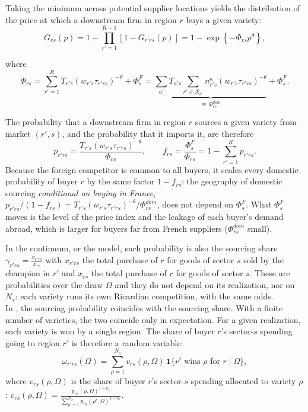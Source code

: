 Taking the minimum across potential supplier locations yields the distribution of the price at which a downstream firm in region $r$ buys a given variety:
\begin{equation}
G_{rs}(p) =1-\prod_{r'=1}^{R+1}\left[1-G_{r'rs}(p)\right] =1-\exp\left\{-\Phi_{rs}p^\theta\right\},
\end{equation}
 
where
\begin{equation}
\Phi_{rs} = \sum_{r'=1}^{R}T_{r's}(w_{r's}\tau_{r'rs})^{-\theta}+\Phi^F_s = \underbrace{\sum_{a'}T_{a's} \sum_{r'\in\mathcal{R}_{a'}} n_{r's}^{\kappa}(w_{r's}\tau_{r'rs})^{-\theta}}_{\equiv\,\Phi^{dom}_{rs}}+\Phi^F_s.
\label{eq:app-Phi}
\end{equation}

The probability that a downstream firm in region $r$ sources a given variety from market $(r',s)$, and the probability that it imports it, are therefore
\begin{equation}
p_{r'rs} = \frac{ T_{r's}(w_{r's}\tau_{r'rs})^{-\theta} }{ \Phi_{rs} },
\qquad
f_{rs}=\frac{\Phi^F_s}{\Phi_{rs}}=1-\sum_{r'=1}^{R}p_{r'rs}.
\label{eq:app-share}
\end{equation}
Because the foreign competitor is common to all buyers, it scales every domestic probability of buyer $r$ by the same factor $1-f_{rs}$: the geography of domestic sourcing \emph{conditional on buying in France}, $p_{r'rs}/(1-f_{rs})=T_{r's}(w_{r's}\tau_{r'rs})^{-\theta}/\Phi^{dom}_{rs}$, does not depend on $\Phi^F_s$. What $\Phi^F_s$ moves is the level of the price index and the leakage of each buyer's demand abroad, which is larger for buyers far from French suppliers ($\Phi^{dom}_{rs}$ small).
 
In the continuum, or the \cite{EatonKortum2002} model, such probability is also the sourcing share $\gamma_{r'rs} = \frac{x_{r'rs}}{x_{rs}}$ with $x_{r'rs}$ the total purchase of $r$ for goods of sector $s$ sold by the champion in $r'$ and $x_{rs}$ the total purchase of $r$ for goods of sector $s$. These are probabilities over the draw $\Omega$ and they do not depend on its realization, nor on $N_s$: each variety runs its own Ricardian competition, with the same odds. \\

In \cite{EatonKortum2002}, the sourcing probability coincides with the sourcing share. With a finite number of varieties, the two coincide only in expectation. For a given realization, each variety is won by a single region. The share of buyer $r$'s sector-$s$ spending going to region $r'$ is therefore a random variable:
\begin{equation}
\omega_{r'rs}(\Omega)=\sum_{\rho=1}^{N_s} v_{rs}(\rho,\Omega)\,\mathbf{1}\{r' \text{ wins } \rho \text{ for } r \mid \Omega \},
\label{eq:app-omega}
\end{equation}
where $v_{rs}(\rho,\Omega)$ is the share of buyer $r$'s sector-$s$ spending allocated to variety $\rho$: $v_{rs}(\rho,\Omega)=\frac{p_{rs}(\rho,\Omega)^{1-\nu_s}}{\sum_{\rho'=1}^{N_s} p_{rs}(\rho',\Omega)^{1-\nu_s}}$. 

